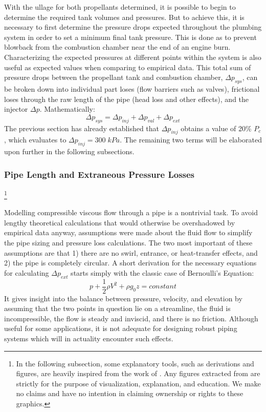 \documentclass[9pt]{article} %
\numberwithin{equation}{section} %
\begin{document}
\hspace{\parindent} With the ullage for both propellants determined, it is possible to begin to determine the required tank volumes and pressures. But to achieve this, it is necessary to first determine the pressure drops expected throughout the plumbing system in order to set a minimum final tank pressure. This is done as to prevent blowback from the combustion chamber near the end of an engine burn. Characterizing the expected pressures at different points within the system is also useful as expected values when comparing to empirical data. This total sum of pressure drops between the propellant tank and combustion chamber, $\Delta p_{sys}$, can be broken down into individual part loses (flow barriers such as valves), frictional loses through the raw length of the pipe (head loss and other effects), and the injector $\Delta p$. Mathematically:
\begin{equation} \label{eq:system_pressure_drop}
\Delta p_{sys} = \Delta p_{inj} + \Delta p_{val} + \Delta p_{ext}
\end{equation}
The previous section has already established that $\Delta p_{inj}$ obtains a value of 20\% $P_{c}$, which evaluates to $\Delta p_{inj} = 300 \; kPa$. The remaining two terms will be elaborated upon further in the following subsections.

\subsubsection{Pipe Length and Extraneous Pressure Losses} \footnote{In the following subsection, some explanatory tools, such as derivations and figures, are heavily inspired from the work of \cite{fluid-mechanics}. Any figures extracted from \cite{fluid-mechanics} are strictly for the purpose of visualization, explanation, and education. We make no claims and have no intention in claiming ownership or rights to these graphics.}

\hspace{\parindent} Modelling compressible viscous flow through a pipe is a nontrivial task. To avoid lengthy theoretical calculations that would otherwise be overshadowed by empirical data anyway, assumptions were made about the fluid flow to simplify the pipe sizing and pressure loss calculations. The two most important of these assumptions are that 1) there are no swirl, entrance, or heat-transfer effects, and 2) the pipe is completely circular. A short derivation for the necessary equations for calculating $\Delta p_{ext}$ starts simply with the classic case of Bernoulli's Equation:
\begin{equation} \label{eq:bernoulli}
p + \frac{1}{2} \rho V^{2} + \rho g_{0} z = constant
\end{equation}
It gives insight into the balance between pressure, velocity, and elevation by assuming that the two points in question lie on a streamline, the fluid is incompressible, the flow is steady and inviscid, and there is no friction. Although useful for some applications, it is not adequate for designing robust piping systems which will in actuality encounter such effects.
\end{document}
